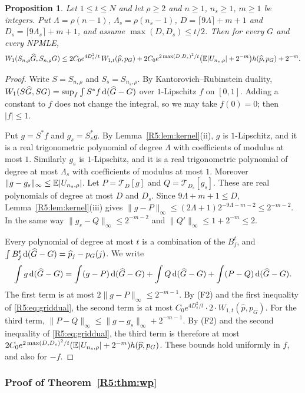\documentclass[11pt]{amsart}
\newtheorem{proposition}[theorem]{Proposition}
\theoremstyle{definition}
\theoremstyle{remark}
\begin{document}
\begin{proposition}\label{R5:prop:smooth}
Let $1\le t\le N$ and let $\rho\ge2$ and $n\ge1$, $n_s\ge1$, $m\ge1$ be
integers.  Put $\Lambda=\rho(n-1)$, $\Lambda_s=\rho(n_s-1)$,
$D=\lceil9\Lambda\rceil+m+1$ and $D_s=\lceil9\Lambda_s\rceil+m+1$, and assume
$\max(D,D_s)\le t/2$.  Then for every $G$ and every NPMLE,
\[
 W_1(S_{n,\rho}\widehat G,S_{n,\rho}G)\le
 2C_0e^{4D_s^2/t}\,W_{1,t}(\widehat p,p_G)
 +2C_0e^{2\max(D,D_s)^2/t}\bigl(\mathbb{E}|U_{n_s,\rho}|+2^{-m}\bigr)h(\widehat p,p_G)
 +2^{-m}.
\]
\end{proposition}

\begin{proof}
Write $S=S_{n,\rho}$ and $S_s=S_{n_s,\rho}$.  By Kantorovich--Rubinstein
duality, $W_1(S\widehat G,SG)=\sup_f\int S^*f\,\mathrm{d}(\widehat G-G)$ over
$1$-Lipschitz $f$ on $[0,1]$.  Adding a constant to $f$ does not change the
integral, so we may take $f(0)=0$; then $|f|\le1$.

Put $g=S^*f$ and $g_s=S_s^*g$.  By Lemma~\ref{R5:lem:kernel}(ii), $g$ is
$1$-Lipschitz, and it is a real trigonometric polynomial of degree $\Lambda$
with coefficients of modulus at most $1$.  Similarly $g_s$ is $1$-Lipschitz,
and it is a real trigonometric polynomial of degree at most $\Lambda_s$ with
coefficients of modulus at most $1$.  Moreover
$\|g-g_s\|_\infty\le\mathbb{E}|U_{n_s,\rho}|$.  Let $P=\mathcal T_D[g]$ and
$Q=\mathcal T_{D_s}[g_s]$.  These are real polynomials of degree at most $D$
and $D_s$.  Since $9\Lambda+m+1\le D$, Lemma~\ref{R5:lem:kernel}(iii) gives
$\|g-P\|_\infty\le(2\Lambda+1)2^{-9\Lambda-m-2}\le2^{-m-2}$.  In the same way
$\|g_s-Q\|_\infty\le2^{-m-2}$ and $\|Q'\|_\infty\le1+2^{-m}\le2$.

Every polynomial of degree at most $t$ is a combination of the $B^t_j$, and
$\int B^t_j\,\mathrm{d}(\widehat G-G)=\widehat p_j-p_G(j)$.  We write
\[
 \int g\,\mathrm{d}(\widehat G-G)=\int(g-P)\,\mathrm{d}(\widehat G-G)+\int Q\,\mathrm{d}(\widehat G-G)
 +\int(P-Q)\,\mathrm{d}(\widehat G-G).
\]
The first term is at most $2\|g-P\|_\infty\le2^{-m-1}$.  By (F2) and the
first inequality of \eqref{R5:eq:griddual}, the second term is at most
$C_0e^{4D_s^2/t}\cdot2\cdot W_{1,t}(\widehat p,p_G)$.  For the third term,
$\|P-Q\|_\infty\le\|g-g_s\|_\infty+2^{-m-1}$.  By (F2) and the second
inequality of \eqref{R5:eq:griddual}, the third term is therefore at most
$2C_0e^{2\max(D,D_s)^2/t}(\mathbb{E}|U_{n_s,\rho}|+2^{-m})h(\widehat p,p_G)$.
These bounds hold uniformly in $f$, and also for $-f$.
\end{proof}

\subsubsection{Proof of Theorem~\ref{R5:thm:wp}}
\end{document}
